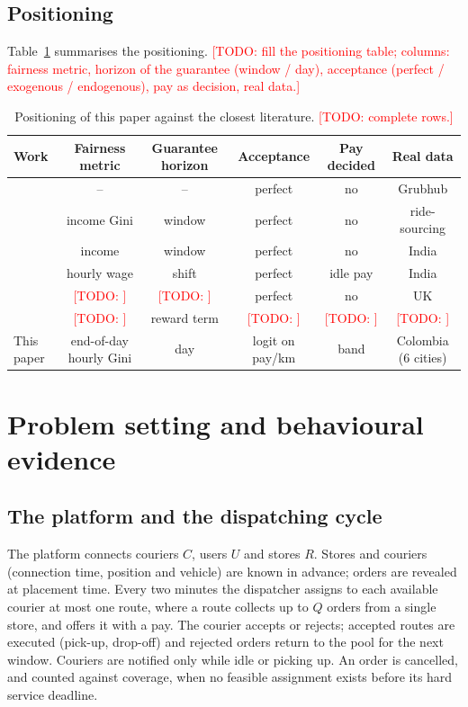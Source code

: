\documentclass[preprint,12pt,authoryear]{elsarticle}%
\newcommand{\todo}[1]{\textcolor{red}{[TODO: #1]}}
\begin{document}
\subsection{Positioning}

Table~\ref{tab:positioning} summarises the positioning. \todo{fill the positioning table; columns: fairness metric, horizon of the guarantee (window / day), acceptance (perfect / exogenous / endogenous), pay as decision, real data.}

\begin{table}[ht]
\centering\small
\caption{Positioning of this paper against the closest literature. \todo{complete rows.}}
\label{tab:positioning}
\begin{tabular}{lccccc}
\toprule
Work & Fairness metric & Guarantee horizon & Acceptance & Pay decided & Real data \\
\midrule
\citet{reyes2018meal} & -- & -- & perfect & no & Grubhub \\
\citet{lesmana2019balancing} & income Gini & window & perfect & no & ride-sourcing \\
\citet{gupta2022fairfoody} & income & window & perfect & no & India \\
\citet{nair2022work4food} & hourly wage & shift & perfect & idle pay & India \\
\citet{martinez2024exploring} & \todo{} & \todo{} & perfect & no & UK \\
\citet{rl2025fairdelivery} & \todo{} & reward term & \todo{} & \todo{} & \todo{} \\
This paper & end-of-day hourly Gini & day & logit on pay/km & band & Colombia (6 cities) \\
\bottomrule
\end{tabular}
\end{table}

\section{Problem setting and behavioural evidence}
\label{sec:setting}

\subsection{The platform and the dispatching cycle}

The platform connects couriers $C$, users $U$ and stores $R$. Stores and couriers (connection time, position and vehicle) are known in advance; orders are revealed at placement time. Every two minutes the dispatcher assigns to each available courier at most one route, where a route collects up to $Q$ orders from a single store, and offers it with a pay. The courier accepts or rejects; accepted routes are executed (pick-up, drop-off) and rejected orders return to the pool for the next window. Couriers are notified only while idle or picking up. An order is cancelled, and counted against coverage, when no feasible assignment exists before its hard service deadline.
\end{document}
